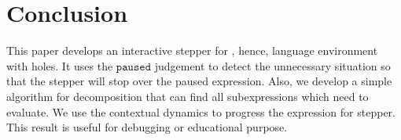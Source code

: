 \section{Conclusion}

This paper develops an interactive stepper for \Hazel, hence, language environment with holes. It uses the $\mathtt{paused}$ judgement to detect the unnecessary situation so that the stepper will stop over the paused expression. Also, we develop a simple algorithm for decomposition that can find all subexpressions which need to evaluate. We use the contextual dynamics to progress the expression for stepper. This result is useful for debugging or educational purpose.